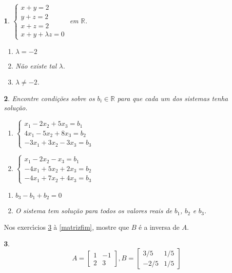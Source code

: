 \documentclass[12pt]{exam}
\newtheorem{exercicio}{}
\newcommand{\real}{\mathbb{R}}
\begin{document}
\begin{exercicio}\label{sistemasfim}
$\begin{cases}
  x + y = 2\\
  y + z = 2\\
  x + z = 2\\
  x + y + \lambda z = 0
\end{cases}$ em $\real$.
\begin{solucao}
  \begin{enumerate}[label={\alph*})]
    \item $\lambda = -2$
    \item N\~ao existe tal $\lambda$.
    \item $\lambda \ne -2$.
  \end{enumerate}
\end{solucao}
\end{exercicio}

\begin{exercicio}
  Encontre condi\c{c}\~oes sobre os $b_i \in \real$ para que cada um dos sistemas tenha solu\c{c}\~ao.
  \begin{enumerate}[label={\alph*})]
    \item $\begin{cases}
      x_1 - 2x_2 + 5x_3 = b_1\\
      4x_1 - 5x_2 + 8x_3 = b_2\\
      -3x_1 + 3x_2 - 3x_3 = b_3
    \end{cases}$

    \item $\begin{cases}
      x_1 - 2x_2 - x_3 = b_1\\
      -4x_1 + 5x_2 + 2x_3 = b_2\\
      -4x_1 + 7x_2 + 4x_3 = b_3
    \end{cases}$
  \end{enumerate}
  \begin{solucao}
    \begin{enumerate}[label={\alph*})]
      \item $b_3 - b_1 + b_2 = 0$
      \item O sistema tem solu\c{c}\~ao para todos os valores reais de $b_1$, $b_2$ e $b_3$.
    \end{enumerate}
  \end{solucao}
\end{exercicio}

Nos exerc{\'\i}cios \ref{matrizinicio} \`a \ref{matrizfim}, mostre que $B$ \'e a inversa de $A$.
\begin{exercicio}\label{matrizinicio}
\[
  A =\begin{bmatrix}
    1 & -1\\
    2 & 3
  \end{bmatrix}, B =\begin{bmatrix}
    3/5 & 1/5\\
    -2/5 & 1/5
  \end{bmatrix}
\]
\end{exercicio}
\end{document}
